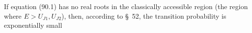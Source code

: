 If equation (90.1) has no real roots in the classically accessible region (the region where $E>U_{J1},U_{J2}$), then, according to \S~52, the transition probability is exponentially small
